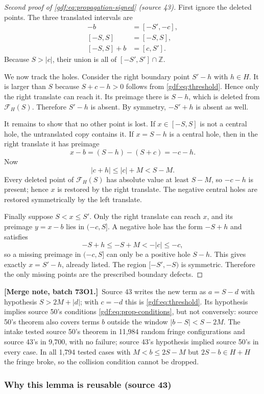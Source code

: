 \documentclass[11pt,a4paper]{article}
\numberwithin{equation}{section}
\theoremstyle{definition}
\theoremstyle{remark}
\theoremstyle{plain}
\newcommand{\Z}{\mathbb Z}
\newcommand{\cF}{\mathcal F}
\newcommand{\mergenote}[1]{\par\smallskip\noindent\textbf{[Merge note, batch 73O1.]}\ #1\par\smallskip}
\newcommand{\src}[1]{\textup{(source #1)}}
\begin{document}
\begin{proof}[Second proof of \eqref{gdf:eq:propagation-signed} \src{43}]
First ignore the deleted points.  The three translated intervals are
\begin{align*}
[-S,S]-b&=[-S',-c],\\
[-S,S]&=[-S,S],\\
[-S,S]+b&=[c,S'].
\end{align*}
Because $S>|c|$, their union is all of $[-S',S']\cap\Z$.

We now track the holes.  Consider the right boundary point $S'-h$ with
$h\in H$.  It is larger than $S$ because $S+c-h>0$ follows from
\eqref{gdf:eq:threshold}.  Hence only the right translate can reach it.  Its
preimage there is $S-h$, which is deleted from $\cF_H(S)$.  Therefore $S'-h$
is absent.  By symmetry, $-S'+h$ is absent as well.

It remains to show that no other point is lost.  If $x\in[-S,S]$ is not a
central hole, the untranslated copy contains it.  If $x=S-h$ is a central
hole, then in the right translate it has preimage
\[
 x-b=(S-h)-(S+c)=-c-h.
\]
Now
\[
 |c+h|\le |c|+M<S-M.
\]
Every deleted point of $\cF_H(S)$ has absolute value at least $S-M$, so
$-c-h$ is present; hence $x$ is restored by the right translate.  The
negative central holes are restored symmetrically by the left translate.

Finally suppose $S<x\le S'$.  Only the right translate can reach $x$, and its
preimage $y=x-b$ lies in $(-c,S]$.  A negative hole has the form $-S+h$ and
satisfies
\[
 -S+h\le -S+M<-|c|\le -c,
\]
so a missing preimage in $(-c,S]$ can only be a positive hole $S-h$.  This
gives exactly $x=S'-h$, already listed.  The region $[-S',-S)$ is symmetric.
Therefore the only missing points are the prescribed boundary defects.
\end{proof}

\mergenote{Source 43 writes the new term as $a=S-d$ with hypothesis
$S>2M+|d|$; with $c=-d$ this is \eqref{gdf:eq:threshold}.  Its hypothesis
implies source 50's conditions \eqref{gdf:eq:prop-conditions}, but not
conversely: source 50's theorem also covers terms $b$ outside the window
$|b-S|<S-2M$.  The intake tested source 50's theorem in 11{,}984 random
fringe configurations and source 43's in 9{,}700, with no failure; source
43's hypothesis implied source 50's in every case.  In all 1{,}794 tested
cases with $M<b\le2S-M$ but $2S-b\in H+H$ the fringe broke, so the collision
condition cannot be dropped.}

\subsubsection*{Why this lemma is reusable \src{43}}
\end{document}
